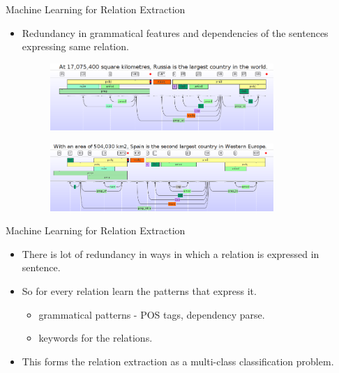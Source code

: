 \documentclass{beamer}
\begin{document}
\begin{frame}{Machine Learning for Relation Extraction}
 
 \begin{itemize}
  \item Redundancy in grammatical features and dependencies of the sentences expressing same relation. \pause
     \begin{figure}
    \centering
    \includegraphics[width = 0.8\textwidth]{images/ex_4}
  \end{figure} \pause
  
   \begin{figure}
    \centering
    \includegraphics[width = 0.8\textwidth]{images/ex_5}
  \end{figure}
 \end{itemize}

\end{frame}

\begin{frame}{Machine Learning for Relation Extraction}
\begin{itemize}
  \item There is lot of redundancy in ways in which a relation is expressed in sentence. \pause
  \item So for every relation learn the patterns that express it. \pause
    \begin{itemize}
      \item grammatical patterns - POS tags, dependency parse. \pause
      \item keywords for the relations. \pause
    \end{itemize}
    
    \item This forms the relation extraction as a multi-class classification problem.
 \end{itemize}
\end{frame}
\end{document}
